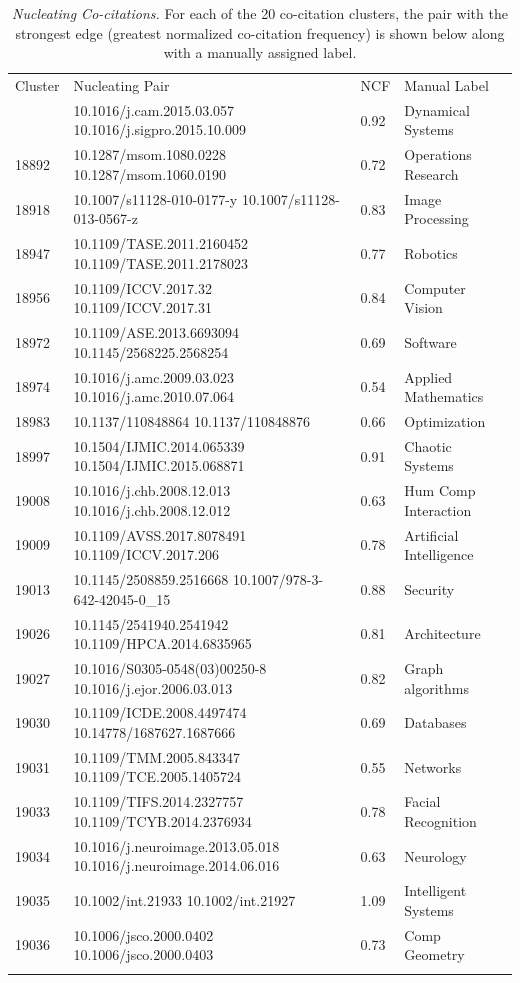 \begin{table}[ht]
\caption{\emph{Nucleating Co-citations.} For each of the 20 co-citation clusters, the pair with the strongest edge (greatest normalized co-citation frequency) is shown below along with a manually assigned label.}
\label{tab:centroid}       
\begin{tabular}{p{8 mm}p{42 mm}ll}
\hline\noalign{\smallskip}
Cluster & Nucleating Pair & NCF & Manual Label \\
\noalign{\smallskip}\hline
18670 & 10.1016/j.cam.2015.03.057 10.1016/j.sigpro.2015.10.009 & 0.92 & Dynamical Systems \\
18892 & 10.1287/msom.1080.0228 10.1287/msom.1060.0190 & 0.72 & Operations Research\\ 
18918 & 10.1007/s11128-010-0177-y 10.1007/s11128-013-0567-z & 0.83 & Image Processing\\ 
18947 & 10.1109/TASE.2011.2160452 10.1109/TASE.2011.2178023 & 0.77 & Robotics\\ 
18956 & 10.1109/ICCV.2017.32 10.1109/ICCV.2017.31 & 0.84 & Computer Vision\\ 
18972 & 10.1109/ASE.2013.6693094 10.1145/2568225.2568254 & 0.69 & Software \\ 
18974 & 10.1016/j.amc.2009.03.023 10.1016/j.amc.2010.07.064 & 0.54 & Applied Mathematics\\ 
18983 & 10.1137/110848864 10.1137/110848876 & 0.66 & Optimization\\ 
18997 & 10.1504/IJMIC.2014.065339 10.1504/IJMIC.2015.068871 & 0.91 & Chaotic Systems \\ 
19008 & 10.1016/j.chb.2008.12.013 10.1016/j.chb.2008.12.012 & 0.63 & Hum Comp Interaction\\ 
19009 & 10.1109/AVSS.2017.8078491 10.1109/ICCV.2017.206 & 0.78 & Artificial Intelligence\\ 
19013 & 10.1145/2508859.2516668 10.1007/978-3-642-42045-0\_15 & 0.88 & Security\\ 
19026 & 10.1145/2541940.2541942 10.1109/HPCA.2014.6835965 & 0.81 & Architecture\\ 
19027 & 10.1016/S0305-0548(03)00250-8 10.1016/j.ejor.2006.03.013 & 0.82 & Graph algorithms\\ 
19030 & 10.1109/ICDE.2008.4497474 10.14778/1687627.1687666 & 0.69 & Databases \\ 
19031 & 10.1109/TMM.2005.843347 10.1109/TCE.2005.1405724 & 0.55 & Networks\\ 
19033 & 10.1109/TIFS.2014.2327757 10.1109/TCYB.2014.2376934 & 0.78 & Facial Recognition\\ 
19034 & 10.1016/j.neuroimage.2013.05.018 10.1016/j.neuroimage.2014.06.016 & 0.63 & Neurology\\ 
19035 & 10.1002/int.21933 10.1002/int.21927 & 1.09 & Intelligent Systems\\ 
19036 & 10.1006/jsco.2000.0402 10.1006/jsco.2000.0403 & 0.73 & Comp Geometry\\ 
\noalign{\smallskip}\hline
\end{tabular}
\end{table}
\newpage

